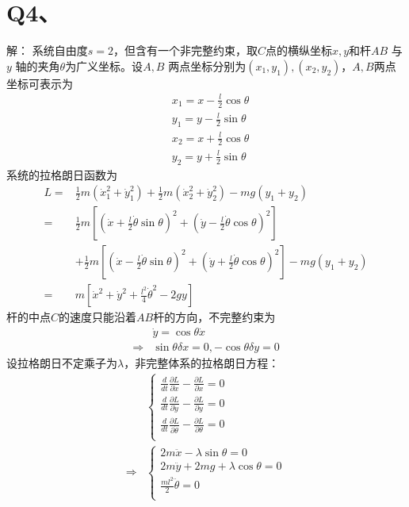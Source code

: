 \documentclass[10pt,a4paper]{article}
\begin{document}
\section*{Q4、}解：
系统自由度$s=2$，但含有一个非完整约束，取$C$点的横纵坐标$x,y$和杆$AB$ 与$y$ 轴的夹角$\theta$为广义坐标。设$A,B$ 两点坐标分别为$(x_1,y_1),(x_2,y_2)$，$A,B$两点坐标可表示为
\begin{align*}
&x_1=x-\frac{l}{2}\cos\theta\\
&y_1=y-\frac{l}{2}\sin\theta\\
&x_2=x+\frac{l}{2}\cos\theta\\
&y_2=y+\frac{l}{2}\sin\theta
\end{align*}
系统的拉格朗日函数为
\begin{align*}
L=&\frac{1}{2}m(\dot{x}_1^2+\dot{y}_1^2)+\frac{1}{2}m(\dot{x}_2^2+\dot{y}_2^2)-mg(y_1+y_2)\\
=&\frac{1}{2}m[(\dot{x}+\frac{l}{2}\dot{\theta}\sin\theta)^2+(\dot{y}-\frac{l}{2}\dot{\theta}\cos\theta)^2]\\
&+\frac{1}{2}m[(\dot{x}-\frac{l}{2}\dot{\theta}\sin\theta)^2+(\dot{y}+\frac{l}{2}\dot{\theta}\cos\theta)^2]-mg(y_1+y_2)\\
=&m[\dot{x}^2+\dot{y}^2+\frac{l^2}{4}\dot{\theta}^2-2gy]
\end{align*}
杆的中点$C$的速度只能沿着$AB$杆的方向，不完整约束为
\begin{align*}
&\dot{y}=\cos\theta\dot{x}\\
\Longrightarrow&\sin\theta\delta x=0, -\cos\theta\delta y=0
\end{align*}
设拉格朗日不定乘子为$\lambda$，非完整体系的拉格朗日方程：
\begin{align*}
&\left\{\begin{array}{lll}
\frac{d}{dt}\frac{\partial L}{\partial\dot{x}}-\frac{\partial L}{\partial x}=0\\
\frac{d}{dt}\frac{\partial L}{\partial\dot{y}}-\frac{\partial L}{\partial y}=0\\
\frac{d}{dt}\frac{\partial L}{\partial\dot{\theta}}-\frac{\partial L}{\partial\theta}=0\\
\end{array}\right.\\
\Longrightarrow&\left\{\begin{array}{lll}
2m\ddot{x}-\lambda\sin\theta=0\\
2m\ddot{y}+2mg+\lambda\cos\theta=0\\
\frac{ml^2}{2}\ddot{\theta}=0\\
\end{array}\right.\\
\end{align*}
\end{document}
